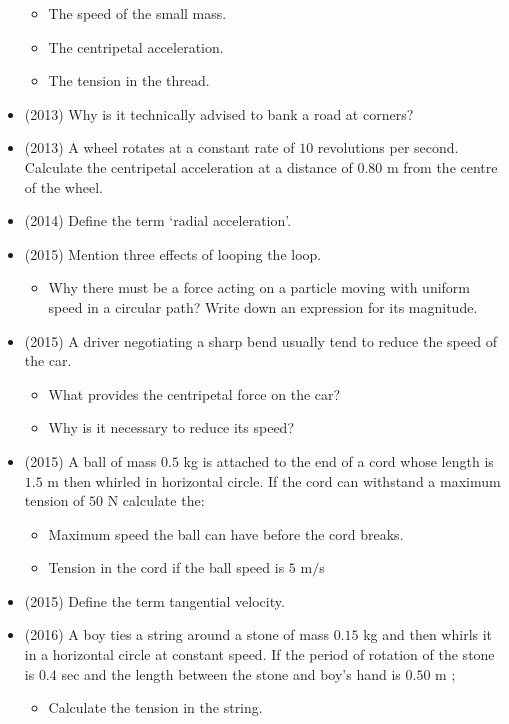 \documentclass{article}
\begin{document}
\begin{itemize}
 \begin{itemize}
\item The speed of the small mass.
\item The centripetal acceleration. 
\item The tension in the thread. 
\end{itemize}
\item (2013)  Why is it technically advised to bank a road at corners?
\item (2013)  A wheel rotates at a constant rate of $ 10$ revolutions per second. Calculate the centripetal acceleration at a distance of $ 0.80$ m from the centre of the wheel.
\item (2014)  Define the term ‘radial acceleration’. 
\item (2015)  Mention three effects of looping the loop.
 \begin{itemize}
\item Why there must be a force acting on a particle moving with uniform speed in a circular path? Write down an expression for its magnitude. 
\end{itemize}
\item (2015)  A driver negotiating a sharp bend usually tend to reduce the speed of the car.
 \begin{itemize}
\item  What provides the centripetal force on the car?
\item Why is it necessary to reduce its speed?
\end{itemize}
\item (2015)  A ball of mass $ 0.5$ kg is attached to the end of a cord whose length is $ 1.5$ m then whirled in horizontal circle. If the cord can withstand a maximum tension of $ 50$ N calculate the:
 \begin{itemize}
\item Maximum speed the ball can have before the cord breaks. 
\item Tension in the cord if the ball speed is $ 5$ m$/$s
\end{itemize}
\item (2015)  Define the term tangential velocity.
\item (2016)  A boy ties a string around a stone of mass $ 0.15$ kg and then whirls it in a horizontal circle at constant speed. If the period of rotation of the stone is $ 0.4$ sec and the length between the stone and boy’s hand is $ 0.50$ m ;
 \begin{itemize}
\item Calculate the tension in the string. 

\end{itemize}
\end{itemize}
\end{document}

